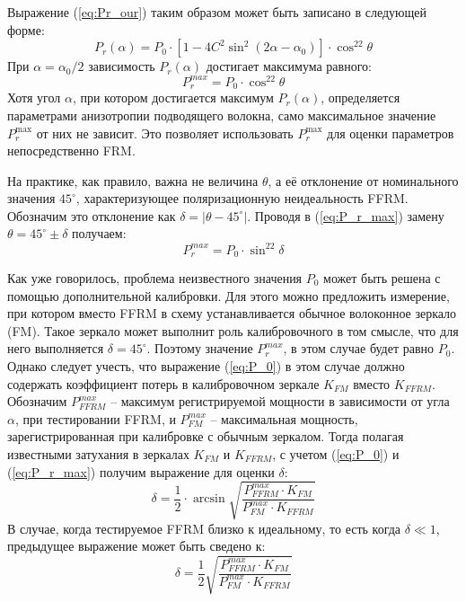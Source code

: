 \documentclass{article}
\begin{document}
Выражение (\ref{eq:Pr_our}) таким образом может быть записано в следующей форме:
\begin{equation}
    \label{eq:Pr_our_1}
    P_r(\alpha)=P_0\cdot\left[1-4C^2\sin^2(2\alpha-\alpha_0)\right]\cdot\cos^22\theta
\end{equation}
При $\alpha=\alpha_0/2$ зависимость $P_r(\alpha)$ достигает максимума равного:
\begin{equation}
    \label{eq:P_r_max}
    P_r^{max}=P_0\cdot\cos^22\theta
\end{equation} 
Хотя угол $\alpha$, при котором достигается максимум $P_r(\alpha)$, определяется параметрами анизотропии подводящего волокна, само максимальное значение $P_r^{\max}$ от них не зависит.
Это позволяет использовать $P_r^{\max}$ для оценки параметров непосредственно FRM.

На практике, как правило, важна не величина $\theta$, а её отклонение от номинального значения $45^\circ$, характеризующее поляризационную неидеальность FFRM.
Обозначим это отклонение как $\delta =| \theta - 45^\circ|$.
Проводя в (\ref{eq:P_r_max}) замену $\theta = 45^\circ \pm \delta$ получаем:
\begin{equation}
    \label{eq:P_r_max_1}
    P_r^{max}=P_0\cdot\sin^22\delta
\end{equation} 

Как уже говорилось, проблема неизвестного значения $P_0$ может быть решена с помощью дополнительной калибровки. Для этого можно предложить измерение, при котором вместо FFRM в схему устанавливается обычное волоконное зеркало (FM).
Такое зеркало может выполнит роль калибровочного в том смысле, что для него выполняется $\delta = 45^\circ$. Поэтому значение $P_r^{max}$, в этом случае будет равно $P_0$. Однако следует учесть, что выражение (\ref{eq:P_0}) в этом случае должно содержать коэффициент потерь в калибровочном зеркале $K_{FM}$ вместо $K_{FFRM}$.  Обозначим $P_{FFRM}^{max}$ – максимум регистрируемой мощности в зависимости от угла $\alpha$, при тестировании FFRM, и $P_{FM}^{max}$ – максимальная мощность, зарегистрированная при калибровке с обычным зеркалом. Тогда полагая известными затухания в зеркалах $K_{FM}$ и $K_{FFRM}$, с учетом (\ref{eq:P_0}) и (\ref{eq:P_r_max}) получим выражение для оценки $\delta$:
\begin{equation}
    \label{eq:delta}
    \delta =\frac{1}{2}\cdot\arcsin\sqrt{\frac{P_{FFRM}^{max}\cdot K_{FM}}{P_{FM}^{max}\cdot K_{FFRM}}}
\end{equation}
В случае, когда тестируемое FFRM близко к идеальному, то есть когда $\delta \ll 1$, предыдущее выражение может быть сведено к:
\begin{equation}
    \label{eq:delta_est}
    \delta =\frac{1}{2}\sqrt{\frac{P_{FFRM}^{max}\cdot K_{FM}}{P_{FM}^{max}\cdot K_{FFRM}}}
\end{equation}
\end{document}
